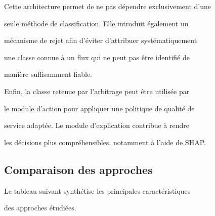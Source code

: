 Cette architecture permet de ne pas dépendre exclusivement d'une

seule méthode de classification. Elle introduit également un

mécanisme de rejet afin d'éviter d'attribuer systématiquement

une classe connue à un flux qui ne peut pas être identifié de

manière suffisamment fiable.



Enfin, la classe retenue par l'arbitrage peut être utilisée par

le module d'action pour appliquer une politique de qualité de

service adaptée. Le module d'explication contribue à rendre

les décisions plus compréhensibles, notamment à l'aide de SHAP.



\subsection{Comparaison des approches}



Le tableau suivant synthétise les principales caractéristiques

des approches étudiées.



